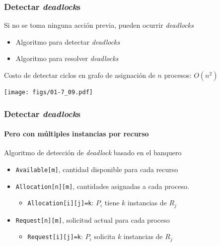 \documentclass[letter]{beamer}
\begin{document}
\begin{frame}
  \frametitle{Detectar {\em deadlock}s}

  Si no se toma ninguna acción previa, pueden ocurrir {\em deadlocks}
  
  
  \begin{itemize}
    \item<3->{Algoritmo para detectar {\em deadlocks}}
    \item<3->{Algoritmo para resolver {\em deadlocks}}
  \end{itemize}
  
  Costo de detectar ciclos en grafo de asignación de $n$ procesos: $O(n^2)$

  \begin{center}
    \texttt{[image: figs/01-7\_09.pdf]}
  \end{center}

\end{frame}


\begin{frame}
  \frametitle{Detectar {\em deadlock}s}
  \framesubtitle{Pero con múltiples instancias por recurso}
  
  Algoritmo de detección de {\em deadlock} basado en el banquero
  
  \begin{itemize}
    \item<2-> {\tt Available[m]}, cantidad disponible para cada recurso
    \item<2-> {\tt Allocation[n][m]}, cantidades asignadas a cada proceso.
      \begin{itemize}
        \item {\tt Allocation[i][j]=k}: $P_i$ tiene $k$ instancias de $R_j$
      \end{itemize}
    \item<2-> {\tt Request[n][m]}, solicitud actual para cada proceso
      \begin{itemize}
        \item {\tt Request[i][j]=k}: $P_i$ solicita $k$ instancias de $R_j$
      \end{itemize}
  \end{itemize}
\end{frame}
\end{document}
